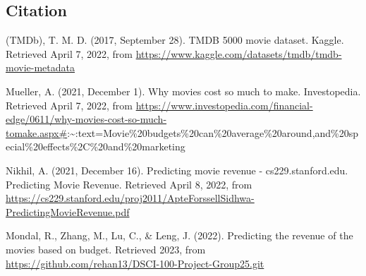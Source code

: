 \documentclass[
]{article}
\begin{document}
\hypertarget{citation}{%
\subsection{Citation}\label{citation}}

(TMDb), T. M. D. (2017, September 28). TMDB 5000 movie dataset. Kaggle. Retrieved April 7, 2022, from \url{https://www.kaggle.com/datasets/tmdb/tmdb-movie-metadata}

Mueller, A. (2021, December 1). Why movies cost so much to make. Investopedia. Retrieved April 7, 2022, from \url{https://www.investopedia.com/financial-edge/0611/why-movies-cost-so-much-tomake.aspx\#}:\textasciitilde:text=Movie\%20budgets\%20can\%20average\%20around,and\%20special\%20effects\%2C\%20and\%20marketing

Nikhil, A. (2021, December 16). Predicting movie revenue - cs229.stanford.edu. Predicting Movie Revenue. Retrieved April 8, 2022, from \url{https://cs229.stanford.edu/proj2011/ApteForssellSidhwa-PredictingMovieRevenue.pdf}

Mondal, R., Zhang, M., Lu, C., \& Leng, J. (2022). Predicting the revenue of the movies based on budget. Retrieved 2023, from \url{https://github.com/rehan13/DSCI-100-Project-Group25.git}
\end{document}
